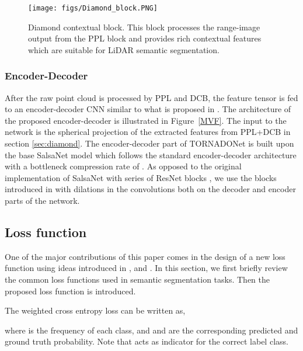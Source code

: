 \documentclass{article}
\begin{document}
 
\begin{figure*}[h]
    \centering
    \texttt{[image: figs/Diamond\_block.PNG]}
    \caption[Diamond]{Diamond contextual block. This block processes the range-image output from the PPL block and provides rich contextual features which are suitable for LiDAR semantic segmentation.}
    \label{Diamond}
\end{figure*}
 


\subsubsection{Encoder-Decoder}
 After the raw point cloud is processed by PPL and DCB, the feature tensor is fed to an encoder-decoder CNN similar to what is proposed in \cite{aksoy2019salsanet}. The architecture of the proposed encoder-decoder is illustrated in Figure~\ref{MVF}. The input to the network is the spherical projection of the extracted features from PPL+DCB in section \ref{sec:diamond}. The encoder-decoder part of TORNADONet is built upon the base SalsaNet model \cite{aksoy2019salsanet} which follows the standard encoder-decoder architecture with a bottleneck compression rate of . As opposed to the original implementation of SalsaNet with series of ResNet blocks \cite{he2016deep}, we use the blocks introduced in \cite{cortinhal2020salsanext} with dilations in the convolutions both on the decoder and encoder parts of the network. 

 \subsection{Loss function}\label{sub:loss}
One of the major contributions of this paper comes in the design of a new loss function using ideas introduced in \cite{zhang2018generalized}, \cite{berman2018lovasz} and \cite{rudin1992nonlinear}. In this section, we first briefly review  the common loss functions used in semantic segmentation tasks. Then the proposed loss function is introduced.




The weighted cross entropy loss \cite{zhang2018generalized, panchapagesan2016multi} can be written as,

\vspace{-2mm}

where  is the frequency of each class, and  and  are the corresponding predicted and ground truth probability. Note that   acts as indicator for the correct label class.
\end{document}
